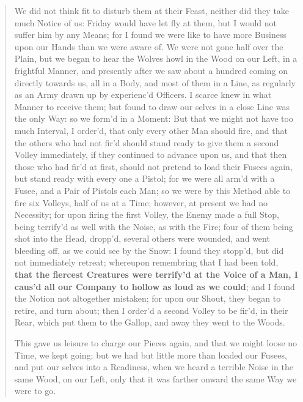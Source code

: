 \documentclass[a4paper]{article}
\begin{document}
\noindent
\begin{minipage}{1\textwidth}
\vspace{1em}
\begin{quotation}
{\ttfamily


We did not think fit to disturb them at their Feast, neither did they take much Notice of us: Friday would have let fly at them, but I would not suffer him by any Means; for I found we were like to have more Business upon our Hands than we were aware of. We were not gone half over the Plain, but we began to hear the Wolves howl in the Wood on our Left, in a frightful Manner, and presently after we saw about a hundred coming on directly towards us, all in a Body, and most of them in a Line, as regularly as an Army drawn up by experienc’d Officers. I scarce knew in what Manner to receive them; but found to draw our selves in a close Line was the only Way: so we form’d in a Moment: But that we might not have too much Interval, I order’d, that only every other Man should fire, and that the others who had not fir’d should stand ready to give them a second Volley immediately, if they continued to advance upon us, and that then those who had fir’d at first, should not pretend to load their Fusees again, but stand ready with every one a Pistol; for we were all arm’d with a Fusee, and a Pair of Pistols each Man; so we were by this Method able to fire six Volleys, half of us at a Time; however, at present we had no Necessity; for upon firing the first Volley, the Enemy made a full Stop, being terrify’d as well with the Noise, as with the Fire; four of them being shot into the Head, dropp’d, several others were wounded, and went bleeding off, as we could see by the Snow: I found they stopp’d, but did not immediately retreat; whereupon remembring that I had been told, \textbf{that the fiercest Creatures were terrify’d at the Voice of a Man, I caus’d all our Company to hollow as loud as we could}; and I found the Notion not altogether mistaken; for upon our Shout, they began to retire, and turn about; then I order’d a second Volley to be fir’d, in their Rear, which put them to the Gallop, and away they went to the Woods.

This gave us leisure to charge our Pieces again, and that we might loose no Time, we kept going; but we had but little more than loaded our Fusees, and put our selves into a Readiness, when we heard a terrible Noise in the same Wood, on our Left, only that it was farther onward the same Way we were to go.



}
\end{quotation}
\vspace{1em}
\end{minipage}
\end{document}
